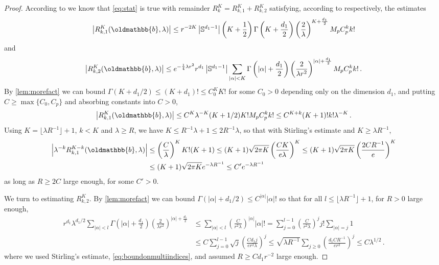 \documentclass[
	fontsize=11pt, 
	twoside=false, 
	abstract=true, 
	a4paper,
]{scrartcl}
\newcommand{\abs}[1]{\left\lvert#1\right\rvert}
\newcommand{\mf}[1]{\oldmathbb{#1}}
\begin{document}
\begin{proof}
	According to \cite[\S~19.3.2]{MR4436039} we know that \cref{eq:stat} is true with remainder $R^{K}_k = R_{k,1}^K+R_{k,2}^K$ satisfying, according to \cite[Lem.~19.3.5,Lem.~19.3.6]{MR4436039} respectively, the estimates
	\[
		\abs{R_{k,1}^K(\mf{b},\lambda)} \leq r^{-2K} \abs{\mathbb{S}^{d_1-1}} \left(K+\frac{1}{2}\right)\Gamma\left(K+\frac{d_1}{2}\right)\left(\frac{2}{\lambda}\right)^{K+\frac{d_1}{2}}  M_pC_p^k k!
	\]
	and 
	\[
		\abs{R_{k,2}^K(\mf{b},\lambda)} \leq e^{-\frac{1}{4}\lambda r^2}r^{d_1} \abs{\mathbb{S}^{d_1-1}} \sum_{\abs{\alpha}< K}\Gamma\left(\abs{\alpha}+\frac{d_1}{2}\right)\left(\frac{2}{\lambda r^2}\right)^{\abs{\alpha}+\frac{d_1}{2}} M_pC_p^k k!\,.
	\]
	By \cref{lem:morefact} we can bound $\Gamma(K+d_1/2) \leq (K+d_1)! \leq C_0^K K!$ for some $C_0 > 0$ depending only on the dimension $d_1$, and putting $C\geq \max\{C_0,C_p\}$ and absorbing constants into $C>0$, 
	\[
		\abs{R_{k,1}^K(\mf{b},\lambda)} \leq C^K \lambda^{-K} (K+1/2) K!M_pC_p^k k!\leq C^{K+k} (K+1)!k!\lambda^{-K}\,.
	\]
	Using $K = \lfloor \lambda R^{-1}\rfloor + 1$, $k< K$ and $\lambda \geq R$, we have $K \leq R^{-1}\lambda + 1 \leq 2R^{-1}\lambda$, 
	so that with Stirling's estimate and $K \geq \lambda R^{-1}$,
	\begin{align*}
		\abs{\lambda^{-k}R_{k,1}^{K-k}(\mf{b},\lambda)} &\leq \left(\frac{C}{\lambda}\right)^{K}K! (K+1)\leq (K+1)\sqrt{2\pi K} \left(\frac{CK}{e\lambda}\right)^{K}\leq (K+1)\sqrt{2\pi K}\left(\frac{2CR^{-1}}{e}\right)^{K} \\
		&\leq (K+1)\sqrt{2\pi K}e^{-\lambda R^{-1}} \leq C'e^{-\lambda R^{-1}}%
	\end{align*}
	as long as $R \geq 2C$ large enough, for some $C'>0$.

	We turn to estimating $R_{k,2}^K$. By \cref{lem:morefact} we can bound $\Gamma(\abs{\alpha}+d_1/2) \leq C^{\abs{\alpha}}\abs{\alpha}!$ so that for all $l \leq \lfloor \lambda R^{-1} \rfloor + 1$, for $R>0$ large enough,
	\begin{equation}\label{eq:Kk}
	\begin{aligned}
		r^{d_1}\lambda^{d_1/2}\sum_{\abs{\alpha}< l} \Gamma\left(\abs{\alpha}+\frac{d_1}{2}\right)\left(\frac{2}{\lambda r^2}\right)^{\abs{\alpha}+\frac{d_1}{2}} &\leq \sum_{\abs{\alpha}< l} \left(\frac{C}{r^2\lambda}\right)^{\abs{\alpha}} \abs{\alpha}! = \sum_{j=0}^{l-1}\left(\frac{C}{r^2\lambda}\right)^{j} j!\sum_{\abs{\alpha}=j} 1 \\
		&\leq C\sum_{j=0}^{l-1} \sqrt{j}\left(\frac{Cd_1 j}{er^2\lambda}\right)^j \leq \sqrt{\lambda R^{-1}} \sum_{j\geq 0} \left(\frac{d_1CR^{-1}}{er^2}\right)^j \leq C \lambda^{1/2}\,.%
	\end{aligned}
	\end{equation}
	where we used Stirling's estimate, \cref{eq:boundonmultiindices}, and assumed $R\geq C d_1r^{-2}$ large enough.


\end{proof}
\end{document}
